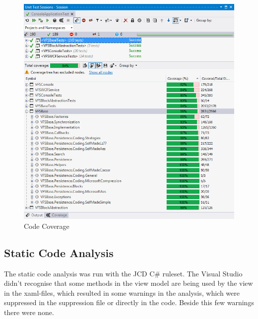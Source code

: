 \documentclass[JCDReport.tex]{subfiles}
\begin{document}
\begin{figure}[h!]
	\centering
	\includegraphics[scale=0.75]{Images/code_coverage.png} 
	\caption{Code Coverage}
	\label{fig:codeCoverage}
\end{figure}	

\subsection{Static Code Analysis}
The static code analysis was run with the JCD C\# ruleset. 
The Visual Studio didn't recognise that some methods in the view model are being used by the view in the xaml-files, which resulted in some warnings in the analysis, which were suppressed in the suppression file or directly in the code. Beside this few warnings there were none.
\end{document}
